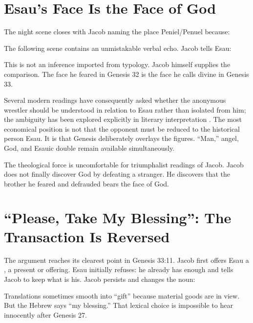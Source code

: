 \section{Esau's Face Is the Face of God}

The night scene closes with Jacob naming the place Peniel/Penuel because:


The following scene contains an unmistakable verbal echo. Jacob tells Esau:


This is not an inference imported from typology. Jacob himself supplies the comparison. The face he feared in Genesis 32 is the face he calls divine in Genesis 33.

Several modern readings have consequently asked whether the anonymous wrestler should be understood in relation to Esau rather than isolated from him; the ambiguity has been explored explicitly in literary interpretation \parencite{MolenJacob}. The most economical position is not that the opponent must be reduced to the historical person Esau. It is that Genesis deliberately overlays the figures. ``Man,'' angel, God, and Esauic double remain available simultaneously.

The theological force is uncomfortable for triumphalist readings of Jacob. Jacob does not finally discover God by defeating a stranger. He discovers that the brother he feared and defrauded bears the face of God.

\section{``Please, Take My Blessing'': The Transaction Is Reversed}

The argument reaches its clearest point in Genesis 33:11. Jacob first offers Esau a , a present or offering. Esau initially refuses: he already has enough and tells Jacob to keep what is his. Jacob persists and changes the noun:


Translations sometimes smooth  into ``gift'' because material goods are in view. But the Hebrew says ``my blessing.'' That lexical choice is impossible to hear innocently after Genesis 27.

